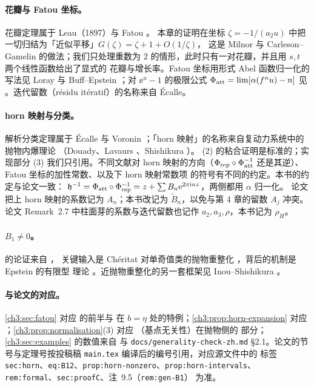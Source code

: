 \notes

\paragraph{花瓣与 Fatou 坐标。} 花瓣定理属于 Leau（1897）与 Fatou \cite{Fatou1919}。
本章的证明在坐标 $\zeta=-1/(a_2u)$ 中把一切归结为「近似平移」$G(\zeta)=\zeta+1+O(1/\zeta)$，
这是 Milnor \cite[\S10]{Milnor2006} 与 Carleson--Gamelin \cite[第 II 章]{CarlesonGamelin1993}
的做法；我们只处理重数为 $2$ 的情形，此时只有一对花瓣，并且用 $s,t$ 两个线性函数给出了显式的
花瓣与增长率。Fatou 坐标用形式 Abel 函数归一化的写法见 Loray \cite{Loray2006} 与
Buff--Epstein \cite{BuffEpstein2002}；对 $\ee^u-1$ 的极限公式 $\Phi_{\mathrm{att}}=\lim[\alpha(f^nu)-n]$
见 \cite[\S2.1]{KneserPaper}。迭代留数（résidu itératif）的名称来自 Écalle。

\paragraph{horn 映射与分类。} 解析分类定理属于 Écalle \cite{Ecalle1981} 与
Voronin \cite{Voronin1981}；「horn 映射」的名称来自复动力系统中的抛物内爆理论
（Douady、Lavaurs \cite{Lavaurs1989}、Shishikura \cite{Shishikura2000}）。
(2) 的粘合证明是标准的；实现部分 (3) 我们只引用。不同文献对 horn
映射的方向（$\Phi_{\mathrm{rep}}\circ\Phi_{\mathrm{att}}^{-1}$ 还是其逆）、Fatou 坐标的加性常数、以及下 horn 映射常数项
的符号有不同的约定。本书的约定与论文一致：
$\mathfrak h^{-1}=\Phi_{\mathrm{att}}\circ\Phi_{\mathrm{rep}}^{-1}=z+\sum B_n\mathrm{e}^{2\pi\mathrm{i} nz}$，两侧都用 $\alpha$ 归一化。
论文把上 horn 映射的系数记为 $A_n$；本书改记为 $\tilde B_n$，以免与第 4 章的留数 $A_j$ 冲突。
论文 Remark~2.7 中柱面芽的系数与迭代留数也记作 $a_2,a_3,\rho$，本书记为 $\rho_H$。

\paragraph{$B_1\ne0$。}  的论证来自 \cite[Prop.~2.4、Remark~2.5]{KneserPaper}，
关键输入是 Chéritat 对单奇值类的抛物重整化 \cite{Cheritat2022}，背后的机制是 Epstein 的有限型
理论 \cite{Epstein1993}。近抛物重整化的另一套框架见 Inou--Shishikura \cite{InouShishikura}。

\paragraph{与论文的对应。} \cref{ch3:sec:fatou} 对应 \cite[\S2.1]{KneserPaper} 的前半与
\cite[\S4, Lemma~4.2、4.3]{KneserPaper} 在 $b=\eta$ 处的特例；\cref{ch3:prop:horn-expansion} 对应
\cite[\S4, (d)]{KneserPaper}；\cref{ch3:prop:normalisation}(3) 对应 \cite[Prop.~9.6]{KneserPaper}（基点无关性）在抛物侧的
部分；\cref{ch3:sec:examples} 的数值来自 \cite[\S2.1、Prop.~2.6、附录 A]{KneserPaper} 与
\texttt{docs/generality-check-zh.md} §2.1。论文的节号与定理号按投稿稿 \texttt{main.tex} 编译后的编号引用，对应源文件中的
标签 \texttt{sec:horn}、\texttt{eq:B12}、\texttt{prop:horn-nonzero}、\texttt{prop:horn-intervals}、
\texttt{rem:formal}、\texttt{sec:proofC}、注~9.5（\texttt{rem:gen-B1}） 为准。

